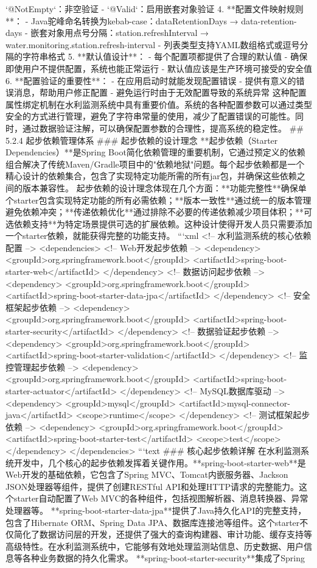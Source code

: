 `@NotEmpty`：非空验证 - `@Valid`：启用嵌套对象验证 4. **配置文件映射规则**： - Java驼峰命名转换为kebab-case：dataRetentionDays → data-retention-days - 嵌套对象用点号分隔：station.refreshInterval → water.monitoring.station.refresh-interval - 列表类型支持YAML数组格式或逗号分隔的字符串格式 5. **默认值设计**： - 每个配置项都提供了合理的默认值 - 确保即使用户不提供配置，系统也能正常运行 - 默认值应该是生产环境可接受的安全值 6. **配置验证的重要性**： - 在应用启动时就能发现配置错误 - 提供有意义的错误消息，帮助用户修正配置 - 避免运行时由于无效配置导致的系统异常 这种配置属性绑定机制在水利监测系统中具有重要价值。系统的各种配置参数可以通过类型安全的方式进行管理，避免了字符串常量的使用，减少了配置错误的可能性。同时，通过数据验证注解，可以确保配置参数的合理性，提高系统的稳定性。 ## 5.2.4 起步依赖管理体系 ### 起步依赖的设计理念 **起步依赖（Starter Dependencies）**是Spring Boot简化依赖管理的重要机制，它通过预定义的依赖组合解决了传统Maven/Gradle项目中的"依赖地狱"问题。每个起步依赖都是一个精心设计的依赖集合，包含了实现特定功能所需的所有jar包，并确保这些依赖之间的版本兼容性。 起步依赖的设计理念体现在几个方面：**功能完整性**确保单个starter包含实现特定功能的所有必需依赖；**版本一致性**通过统一的版本管理避免依赖冲突；**传递依赖优化**通过排除不必要的传递依赖减少项目体积；**可选依赖支持**为特定场景提供可选的扩展依赖。这种设计使得开发人员只需要添加一个starter依赖，就能获得完整的功能支持。 ```xml <!-- 水利监测系统的核心依赖配置 --> <dependencies> <!-- Web开发起步依赖 --> <dependency> <groupId>org.springframework.boot</groupId> <artifactId>spring-boot-starter-web</artifactId> </dependency> <!-- 数据访问起步依赖 --> <dependency> <groupId>org.springframework.boot</groupId> <artifactId>spring-boot-starter-data-jpa</artifactId> </dependency> <!-- 安全框架起步依赖 --> <dependency> <groupId>org.springframework.boot</groupId> <artifactId>spring-boot-starter-security</artifactId> </dependency> <!-- 数据验证起步依赖 --> <dependency> <groupId>org.springframework.boot</groupId> <artifactId>spring-boot-starter-validation</artifactId> </dependency> <!-- 监控管理起步依赖 --> <dependency> <groupId>org.springframework.boot</groupId> <artifactId>spring-boot-starter-actuator</artifactId> </dependency> <!-- MySQL数据库驱动 --> <dependency> <groupId>mysql</groupId> <artifactId>mysql-connector-java</artifactId> <scope>runtime</scope> </dependency> <!-- 测试框架起步依赖 --> <dependency> <groupId>org.springframework.boot</groupId> <artifactId>spring-boot-starter-test</artifactId> <scope>test</scope> </dependency> </dependencies> ```text ### 核心起步依赖详解 在水利监测系统开发中，几个核心的起步依赖发挥着关键作用。**spring-boot-starter-web**是Web开发的基础依赖，它包含了Spring MVC、Tomcat内嵌服务器、Jackson JSON处理器等组件，提供了创建RESTful API和处理HTTP请求的完整能力。这个starter自动配置了Web MVC的各种组件，包括视图解析器、消息转换器、异常处理器等。 **spring-boot-starter-data-jpa**提供了Java持久化API的完整支持，包含了Hibernate ORM、Spring Data JPA、数据库连接池等组件。这个starter不仅简化了数据访问层的开发，还提供了强大的查询构建器、审计功能、缓存支持等高级特性。在水利监测系统中，它能够有效地处理监测站信息、历史数据、用户信息等各种业务数据的持久化需求。 **spring-boot-starter-security**集成了Spring 
